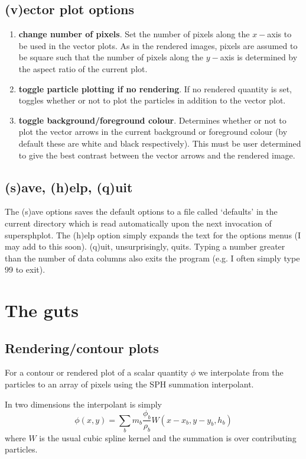 \documentclass[a4paper,12pt]{article}
\begin{document}
\subsection{(v)ector plot options}
\begin{enumerate}
\item \textbf{change number of pixels}. Set the number of pixels along the
$x-$axis to be used in the vector plots. As in the rendered images, pixels are assumed to be square such that the number of pixels along
the $y-$axis is determined by the aspect ratio of the current plot.
\item \textbf{toggle particle plotting if no rendering}. If no rendered quantity
is set, toggles whether or not to plot the particles in addition to the vector
plot.
\item \textbf{toggle background/foreground colour}. Determines whether or not to
plot the vector arrows in the current background or foreground colour (by
default these are white and black respectively). This must
be user determined to give the best contrast between the vector arrows and the
rendered image.
\end{enumerate}

\subsection{(s)ave, (h)elp, (q)uit}
 The (s)ave options saves the default options to a file called `defaults' in the
current directory which is read automatically upon the next invocation of
supersphplot. The (h)elp option simply expands the text for the options menus (I
may add to this soon). (q)uit, unsurprisingly, quits. Typing a number greater than the number of
data columns also exits the program (e.g. I often simply type 99 to exit).

\section{The guts}

\subsection{Rendering/contour plots}
 For a contour or rendered plot of a scalar quantity $\phi$ we
interpolate from the particles to an array of pixels using the SPH summation
interpolant.

In two dimensions the interpolant is simply
\begin{equation}
\phi(x,y) = \sum_b m_b \frac{\phi_b}{\rho_b} W(x - x_b, y-y_b, h_b)
\end{equation}
where $W$ is the usual cubic spline kernel and the summation is over
contributing particles.
\end{document}
